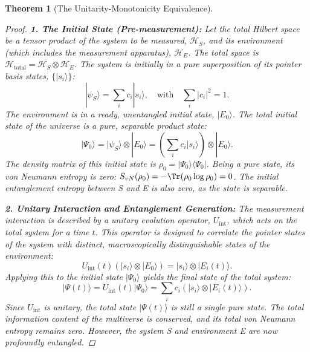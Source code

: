 \documentclass[11pt, letterpaper]{report}
\theoremstyle{plain} %
\newtheorem{theorem}{Theorem}[chapter]
\theoremstyle{definition} %
\theoremstyle{remark} %
\begin{document}
\begin{theorem}[The Unitarity-Monotonicity Equivalence]
\begin{proof}
\textbf{1. The Initial State (Pre-measurement):}
Let the total Hilbert space be a tensor product of the system to be measured, $\mathcal{H}_S$, and its environment (which includes the measurement apparatus), $\mathcal{H}_E$. The total space is $\mathcal{H}_{\text{total}} = \mathcal{H}_S \otimes \mathcal{H}_E$.
The system is initially in a pure superposition of its pointer basis states, $\{|s_i\rangle\}$:
\begin{equation}
    |\psi_S\rangle = \sum_i c_i |s_i\rangle, \quad \text{with} \quad \sum_i |c_i|^2 = 1.
\end{equation}
The environment is in a ready, unentangled initial state, $|E_0\rangle$. The total initial state of the universe is a pure, separable product state:
\begin{equation}
    |\Psi_0\rangle = |\psi_S\rangle \otimes |E_0\rangle = \left(\sum_i c_i |s_i\rangle\right) \otimes |E_0\rangle.
\end{equation}
The density matrix of this initial state is $\rho_0 = |\Psi_0\rangle\langle\Psi_0|$. Being a pure state, its von Neumann entropy is zero: $S_{vN}(\rho_0) = -\Tr(\rho_0 \log\rho_0) = 0$. The initial entanglement entropy between S and E is also zero, as the state is separable.

\textbf{2. Unitary Interaction and Entanglement Generation:}
The measurement interaction is described by a unitary evolution operator, $U_{\text{int}}$, which acts on the total system for a time $t$. This operator is designed to correlate the pointer states of the system with distinct, macroscopically distinguishable states of the environment:
\begin{equation}
    U_{\text{int}}(t) \left(|s_i\rangle \otimes |E_0\rangle\right) = |s_i\rangle \otimes |E_i(t)\rangle.
\end{equation}
Applying this to the initial state $|\Psi_0\rangle$ yields the final state of the total system:
\begin{equation}
    |\Psi(t)\rangle = U_{\text{int}}(t)|\Psi_0\rangle = \sum_i c_i \left(|s_i\rangle \otimes |E_i(t)\rangle\right).
    \label{eq:entangled_system_environment}
\end{equation}
Since $U_{\text{int}}$ is unitary, the total state $|\Psi(t)\rangle$ is still a single pure state. The total information content of the multiverse is conserved, and its total von Neumann entropy remains zero. However, the system S and environment E are now profoundly entangled.


\end{proof}
\end{theorem}
\end{document}
